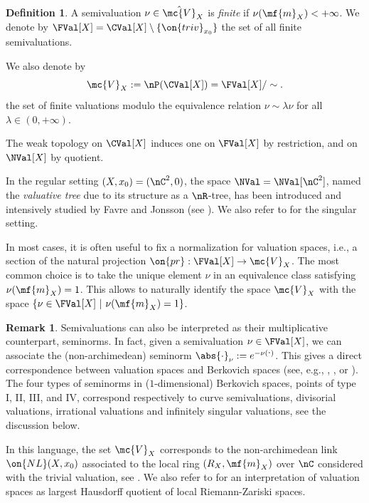 \documentclass[11 pt, twoside, a4paper]{amsart}
\theoremstyle{definition}
\newtheorem{rem}[thm]{Remark}
\newtheorem{defi}[thm]{Definition}
\theoremstyle{definition}
\newcommand{\Val}[1][]{\mc{V}_{#1}}
\newcommand{\triv}{\on{triv}}
\newcommand{\var}{{\displaystyle\cdot}}
\begin{document}
\begin{defi}
A semivaluation $\nu\in \hat{\mc{V}}_X$ is \emph{finite} if $\nu(\mf{m}_X)<+\infty$. We denote by $\FVal[X]=\CVal[X] \setminus \{\triv_{x_0}\}$ the set of all finite semivaluations.
	
We also denote by
\[
\Val[X]:=\nP(\CVal[X]) = \FVal[X]/\sim\text.
\]
the set of finite valuations modulo the equivalence relation $\nu \sim \lambda \nu$ for all $\lambda \in (0,+\infty)$.
\end{defi}

The weak topology on $\CVal[X]$ induces one on $\FVal[X]$ by restriction, and on $\NVal[X]$ by quotient.

In the regular setting $(X,x_0)=(\nC^2,0)$, the space $\NVal=\NVal[\nC^2]$, named the \emph{valuative tree} due to its structure as a $\nR$-tree, has been introduced and intensively studied by Favre and Jonsson (see \cite{favre-jonsson:valtree, favre-jonsson:eigenval, jonsson:berkovich}).
We also refer to \cite{favre:holoselfmapssingratsurf, gignac-ruggiero:locdynnoninvnormsurfsing} for the singular setting.

In most cases, it is often useful to fix a normalization for valuation spaces, i.e., a section of the natural projection $\on{pr}:\FVal[X] \to \Val[X]$.
The most common choice is to take the unique element $\nu$ in an equivalence class satisfying $\nu(\mf{m}_X)=1$.
This allows to naturally identify the space $\Val[X]$ with the space
$%
\{\nu \in \FVal[X]\ |\ \nu(\mf{m}_X)=1\}$.

\begin{rem}
Semivaluations can also be interpreted as their multiplicative counterpart, seminorms.
In fact, given a semivaluation $\nu \in \FVal[X]$, we can associate the (non-archimedean) seminorm $\abs{\var}_\nu:=e^{-\nu(\var)}$.
This gives a direct correspondence between valuation spaces and Berkovich spaces (see, e.g.,  \cite{berkovich:book}, \cite[Section 4.5]{favre-jonsson:valtree}, or \cite[Section 1]{dujardin-favre-ruggiero:polyskewprod}).
The four types of seminorms in ($1$-dimensional) Berkovich spaces, points of type I, II, III, and IV, correspond respectively to curve semivaluations, divisorial valuations, irrational valuations and infinitely singular valuations, see the discussion below.

In this language, the set $\Val[X]$ corresponds to the non-archimedean link $\on{NL}(X,x_0)$ associated to the local ring $(R_X,\mf{m}_X)$ over $\nC$ considered with the trivial valuation, see \cite{fantini:normalizedlinks, fantini:normalizedBerkovich, thuillier:homotopy, fantini-favre-ruggiero:sandwichselfsim,gignac-ruggiero:locdynnoninvnormsurfsing}. We also refer to \cite{defelipe:topspacesval} for an interpretation of valuation spaces as largest Hausdorff quotient of local Riemann-Zariski spaces.
\end{rem}
\end{document}

